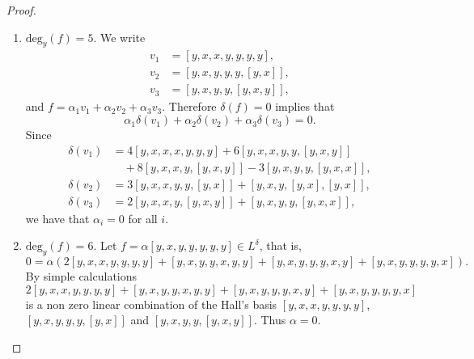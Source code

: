 \documentclass{cimart}
\begin{document}
\begin{proof}
\begin{enumerate}
\item $\mbox{deg}_y(f) = 5$.   We write 
\begin{align*}
v_1 &= [y, x, x, y, y, y, y],\\
v_2 &= [y, x, y, y, y, [y, x]],\\
v_3 &= [y, x, y, y, [y, x, y]],
\end{align*}
and $f = \alpha_1 v_1 + \alpha_2 v_2  + \alpha_3 v_3$. Therefore $\delta(f) = 0$ implies that 
$$\alpha_1 \delta(v_1) + \alpha_2 \delta (v_2)  + \alpha_3 \delta (v_3) = 0.$$ 
Since 
\begin{align*}
\delta(v_1) 
&= 4[y, x, x, x, y, y, y] 
+ 6[y, x, x, y, y, [y, x, y]] \\
&\quad + 8[y, x, x, y, [y, x, y]] 
- 3[y, x, y, y, [y, x, x]], \\
\delta(v_2) 
&= 3[y, x, x, y, y, [y, x]] 
+ [y, x, y, [y, x], [y, x]], \\
\delta(v_3) 
&= 2[y, x, x, y, [y, x, y]] 
+ [y, x, y, y, [y, x, x]],
\end{align*}
 we have that  $\alpha_i =  0$ for all $i$.

\item $\mbox{deg}_y(f) = 6$. Let $f = \alpha [y, x, y, y, y, y, y]  \in L^\delta$, that is, 
\[
0 = \alpha(2 [y, x, x, y, y, y, y]+ [y, x, y, y, x, y, y] + [y, x, y, y, y, x, y] + [y, x, y, y, y, y, x]).
\]
By simple calculations 
\[
2 [y, x, x, y, y, y, y] + [y, x, y, y, x, y, y] + [y, x, y, y, y, x, y] + [y, x, y, y, y, y, x]
\]
is a non zero linear combination of the Hall's basis $[y, x, x, y, y, y, y]$, $[y, x, y, y, y, [y, x]]$ and $[y, x, y, y, [y, x, y]]$. Thus $\alpha = 0$.
\end{enumerate}
\vspace{-.77cm}
\end{proof}
\end{document}
